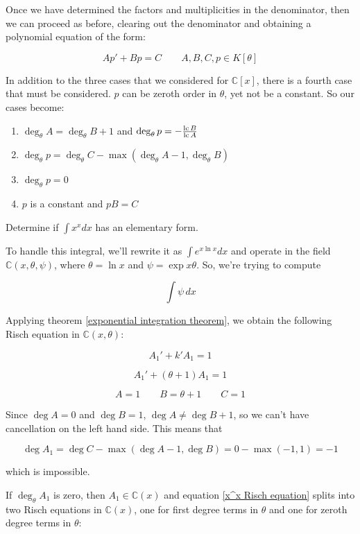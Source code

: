 Once we have determined the factors and multiplicities in the denominator,
then we can proceed as before, clearing out the denominator and obtaining
a polynomial equation of the form:

\begin{equation}
\label{eq: K[theta] normal Risch}
A p' + B p = C \qquad A,B,C,p \in K[\theta]
\end{equation}

In addition to the three cases that we considered for ${\mathbb C}[x]$,
there is a fourth case that must be considered.  $p$ can be
zeroth order in $\theta$, yet not be a constant.  So our
cases become:

\begin{enumerate}
\item $\deg_\theta A = \deg_\theta B + 1$ and $\deg_\theta p =-\frac{{\rm lc\,} B}{{\rm lc\,} A} $
\item $\deg_\theta p = \deg_\theta C - \max(\deg_\theta A - 1, \deg_\theta B)$
\item $\deg_\theta p = 0$
\item $p$ is a constant and $pB = C$
\end{enumerate}

\vfill\eject

\example Determine if $\int x^x dx$ has an elementary form.

To handle this integral, we'll rewrite it as $\int e^{x \ln x} dx$
and operate in the field ${\mathbb C}(x, \theta, \psi)$, where
$\theta = \ln x$ and $\psi = \exp x\theta$.  So, we're
trying to compute

$$\int \psi\, dx$$

Applying theorem \ref{exponential integration theorem}, we
obtain the following Risch equation in
${\mathbb C}(x, \theta)$:

$$A_1' + k' A_1 = 1$$

\begin{equation}
\label{x^x Risch equation}
A_1' + (\theta + 1) A_1 = 1
\end{equation}

$$A=1 \qquad B=\theta +1 \qquad C=1$$

Since $\deg A = 0$ and $\deg B=1$, $\deg A \ne \deg B + 1$,
so we can't have cancellation on the left hand side.
This means that

$$\deg A_1 = \deg C - \max(\deg A - 1, \deg B) = 0 - \max(-1, 1) = -1$$

which is impossible.

If $\deg_\theta A_1$ is zero,
then $A_1 \in {\mathbb C}(x)$ and equation
\eqref{x^x Risch equation}
splits into two Risch equations in ${\mathbb C}(x)$,
one for first degree
terms in $\theta$ and one for zeroth degree
terms in $\theta$:

